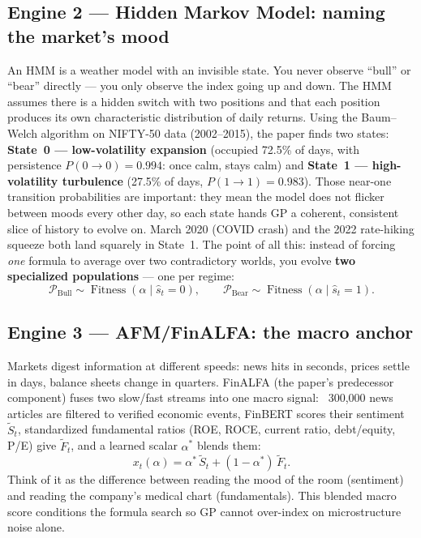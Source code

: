 \documentclass[11pt,a4paper]{article}
\begin{document}
\subsection{Engine 2 --- Hidden Markov Model: naming the market's mood}

\begin{plaineng}
An HMM is a weather model with an invisible state. You never observe ``bull''
or ``bear'' directly --- you only observe the index going up and down. The HMM
assumes there is a hidden switch with two positions and that each position
produces its own characteristic distribution of daily returns. Using the
Baum--Welch algorithm on NIFTY-50 data (2002--2015), the paper finds two
states: \textbf{State~0 --- low-volatility expansion} (occupied 72.5\% of days,
with persistence $P(0\!\to\!0)=0.994$: once calm, stays calm) and
\textbf{State~1 --- high-volatility turbulence} (27.5\% of days,
$P(1\!\to\!1)=0.983$). Those near-one transition probabilities are important:
they mean the model does not flicker between moods every other day, so each
state hands GP a coherent, consistent slice of history to evolve on. March 2020
(COVID crash) and the 2022 rate-hiking squeeze both land squarely in State~1.
The point of all this: instead of forcing \emph{one} formula to average over
two contradictory worlds, you evolve \textbf{two specialized populations} ---
one per regime:
\begin{equation}
  \mathcal{P}_{\text{Bull}} \sim \operatorname{Fitness}(\alpha \mid \hat{s}_t=0),
  \qquad
  \mathcal{P}_{\text{Bear}} \sim \operatorname{Fitness}(\alpha \mid \hat{s}_t=1).
  \label{eq:dualgp}
\end{equation}
\end{plaineng}

\subsection{Engine 3 --- AFM/FinALFA: the macro anchor}

\begin{plaineng}
Markets digest information at different speeds: news hits in seconds, prices
settle in days, balance sheets change in quarters. FinALFA (the paper's
predecessor component) fuses two slow/fast streams into one macro signal:
~300{,}000 news articles are filtered to verified economic events, FinBERT
scores their sentiment $\tilde{S}_t$, standardized fundamental ratios
(ROE, ROCE, current ratio, debt/equity, P/E) give $\tilde{F}_t$, and a learned
scalar $\alpha^{*}$ blends them:
\begin{equation}
  x_t(\alpha) = \alpha^{*}\,\tilde{S}_t + (1-\alpha^{*})\,\tilde{F}_t .
  \label{eq:afm}
\end{equation}
Think of it as the difference between reading the mood of the room (sentiment)
and reading the company's medical chart (fundamentals). This blended macro
score conditions the formula search so GP cannot over-index on microstructure
noise alone.
\end{plaineng}
\end{document}
